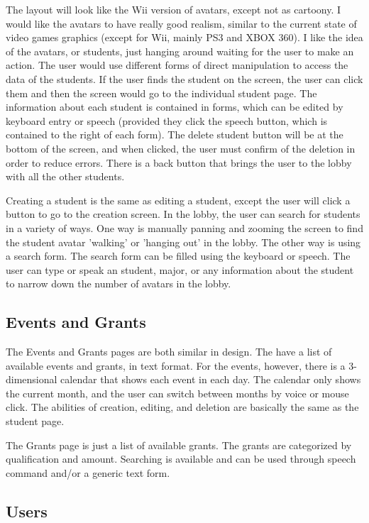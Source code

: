 \documentclass{article}
\begin{document}
The layout will look like the Wii version of avatars, except not as cartoony.  I would like the avatars to have really good realism, similar to the current state of video games graphics (except for Wii, mainly PS3 and XBOX 360).  I like the idea of the avatars, or students, just hanging around waiting for the user to make an action.  The user would use different forms of direct manipulation to access the data of the students.  If the user finds the student on the screen, the user can click them and then the screen would go to the individual student page.  The information about each student is contained in forms, which can be edited by keyboard entry or speech (provided they click the speech button, which is contained to the right of each form).  The delete student button will be at the bottom of the screen, and when clicked, the user must confirm of the deletion in order to reduce errors.  There is a back button that brings the user to the lobby with all the other students. 

Creating a student is the same as editing a student, except the user will click a button to go to the creation screen.  In the lobby, the user can search for students in a variety of ways.  One way is manually panning and zooming the screen to find the student avatar 'walking' or 'hanging out' in the lobby.  The other way is using a search form.  The search form can be filled using the keyboard or speech.  The user can type or speak an student, major, or any information about the student to narrow down the number of avatars in the lobby.

\subsection{Events and Grants}

The Events and Grants pages are both similar in design.  The have a list of available events and grants, in text format.  For the events, however, there is a 3-dimensional calendar that shows each event in each day.  The calendar only shows the current month, and the user can switch between months by voice or mouse click.  The abilities of creation, editing, and deletion are basically the same as the student page. 

The Grants page is just a list of available grants.  The grants are categorized by qualification and amount.  Searching is available and can be used through speech command and/or a generic text form.

\subsection{Users}
\end{document}
